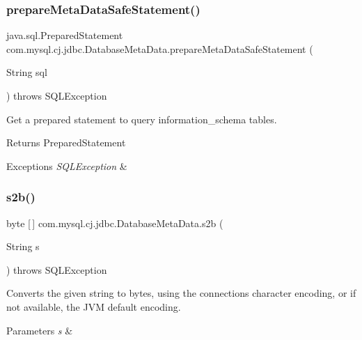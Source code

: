 \subsubsection{\texorpdfstring{prepare\+Meta\+Data\+Safe\+Statement()}{prepareMetaDataSafeStatement()}}
{\footnotesize\ttfamily java.\+sql.\+Prepared\+Statement com.\+mysql.\+cj.\+jdbc.\+Database\+Meta\+Data.\+prepare\+Meta\+Data\+Safe\+Statement (\begin{DoxyParamCaption}\item[{String}]{sql }\end{DoxyParamCaption}) throws S\+Q\+L\+Exception\hspace{0.3cm}{\ttfamily [protected]}}

Get a prepared statement to query information\+\_\+schema tables.

\begin{DoxyReturn}{Returns}
Prepared\+Statement 
\end{DoxyReturn}

\begin{DoxyExceptions}{Exceptions}
{\em S\+Q\+L\+Exception} & \\
\hline
\end{DoxyExceptions}
\mbox{\label{classcom_1_1mysql_1_1cj_1_1jdbc_1_1_database_meta_data_a23ae1936e5c32dc95c519cd9b5080b75}} 
\subsubsection{\texorpdfstring{s2b()}{s2b()}}
{\footnotesize\ttfamily byte \mbox{[}$\,$\mbox{]} com.\+mysql.\+cj.\+jdbc.\+Database\+Meta\+Data.\+s2b (\begin{DoxyParamCaption}\item[{String}]{s }\end{DoxyParamCaption}) throws S\+Q\+L\+Exception\hspace{0.3cm}{\ttfamily [protected]}}

Converts the given string to bytes, using the connection\textquotesingle{}s character encoding, or if not available, the J\+VM default encoding.


\begin{DoxyParams}{Parameters}
{\em s} & \\
\hline
\end{DoxyParams}
\mbox{\label{classcom_1_1mysql_1_1cj_1_1jdbc_1_1_database_meta_data_a2acfc886d13080ef24bf330ac054b2d7}} 
